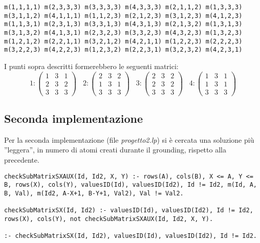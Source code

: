 \documentclass{article}
\begin{document}
\begin{lstlisting}
m(1,1,1,1) m(2,3,3,3) m(3,3,3,3) m(4,3,3,3) m(2,1,1,2) m(1,3,3,3)
m(3,1,1,2) m(4,1,1,1) m(1,1,2,3) m(2,1,2,3) m(3,1,2,3) m(4,1,2,3)
m(1,1,3,1) m(2,3,1,3) m(3,3,1,3) m(4,3,1,3) m(2,1,3,2) m(1,3,1,3)
m(3,1,3,2) m(4,1,3,1) m(2,3,2,3) m(3,3,2,3) m(4,3,2,3) m(1,3,2,3)
m(1,2,1,2) m(2,2,1,1) m(3,2,1,2) m(4,2,1,1) m(1,2,2,3) m(2,2,2,3)
m(3,2,2,3) m(4,2,2,3) m(1,2,3,2) m(2,2,3,1) m(3,2,3,2) m(4,2,3,1)
\end{lstlisting}
I punti sopra descritti formerebbero le seguenti matrici:
$$
1 : 
\left(\begin{array}{ccc}
1 & 3 & 1 \\
2 & 3 & 2 \\
3 & 3 & 3
\end{array}\right)
\;\;\;
2 : 
\left(\begin{array}{ccc}
2 & 3 & 2 \\
1 & 3 & 1 \\
3 & 3 & 3
\end{array}\right)
\;\;\;
3 : 
\left(\begin{array}{ccc}
2 & 3 & 2 \\
2 & 3 & 2 \\
3 & 3 & 3
\end{array}\right)
\;\;\;
4 : 
\left(\begin{array}{ccc}
1 & 3 & 1 \\
1 & 3 & 1 \\
3 & 3 & 3
\end{array}\right)
$$
\subsection*{Seconda implementazione}
Per la seconda implementazione (file \textit{progetto2.lp}) si è cercata una soluzione più ''leggera'', in numero di atomi creati durante il grounding, rispetto alla precedente.\\

\begin{lstlisting}
checkSubMatrixSXAUX(Id, Id2, X, Y) :- rows(A), cols(B), X <= A, Y <= B, rows(X), cols(Y), valuesID(Id), valuesID(Id2), Id != Id2, m(Id, A, B, Val), m(Id2, A-X+1, B-Y+1, Val2), Val != Val2.

checkSubMatrixSX(Id, Id2) :- valuesID(Id), valuesID(Id2), Id != Id2, rows(X), cols(Y), not checkSubMatrixSXAUX(Id, Id2, X, Y).

:- checkSubMatrixSX(Id, Id2), valuesID(Id), valuesID(Id2), Id != Id2.
\end{lstlisting}
\end{document}

